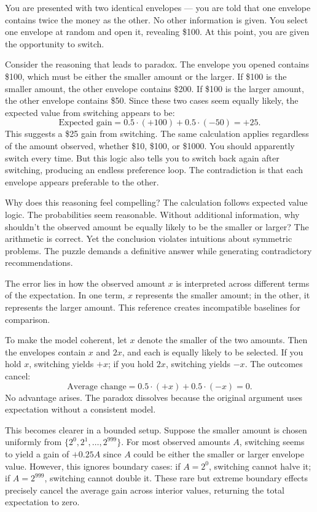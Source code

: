 You are presented with two identical envelopes — you are told that one envelope contains twice the money as the other. No other information is given. You select one envelope at random and open it, revealing \$100. At this point, you are given the opportunity to switch.

Consider the reasoning that leads to paradox. The envelope you opened contains \$100, which must be either the smaller amount or the larger. If \$100 is the smaller amount, the other envelope contains \$200. If \$100 is the larger amount, the other envelope contains \$50. Since these two cases seem equally likely, the expected value from switching appears to be:
\[
\text{Expected gain} = 0.5 \cdot (+100) + 0.5 \cdot (-50) = +25.
\]
This suggests a \$25 gain from switching. The same calculation applies regardless of the amount observed, whether \$10, \$100, or \$1000. You should apparently switch every time. But this logic also tells you to switch back again after switching, producing an endless preference loop. The contradiction is that each envelope appears preferable to the other.

Why does this reasoning feel compelling? The calculation follows expected value logic. The probabilities seem reasonable. Without additional information, why shouldn't the observed amount be equally likely to be the smaller or larger? The arithmetic is correct. Yet the conclusion violates intuitions about symmetric problems. The puzzle demands a definitive answer while generating contradictory recommendations.

The error lies in how the observed amount $x$ is interpreted across different terms of the expectation. In one term, $x$ represents the smaller amount; in the other, it represents the larger amount. This reference creates incompatible baselines for comparison.

To make the model coherent, let \( x \) denote the smaller of the two amounts. Then the envelopes contain \( x \) and \( 2x \), and each is equally likely to be selected. If you hold \( x \), switching yields \( +x \); if you hold \( 2x \), switching yields \( -x \). The outcomes cancel:
\[
\text{Average change} = 0.5 \cdot (+x) + 0.5 \cdot (-x) = 0.
\]
No advantage arises. The paradox dissolves because the original argument uses expectation without a consistent model.

This becomes clearer in a bounded setup. Suppose the smaller amount is chosen uniformly from \( \{2^0, 2^1, \dots, 2^{999}\} \). For most observed amounts \( A \), switching seems to yield a gain of \( +0.25A \) since \( A \) could be either the smaller or larger envelope value. However, this ignores boundary cases: if \( A = 2^0 \), switching cannot halve it; if \( A = 2^{999} \), switching cannot double it. These rare but extreme boundary effects precisely cancel the average gain across interior values, returning the total expectation to zero.

